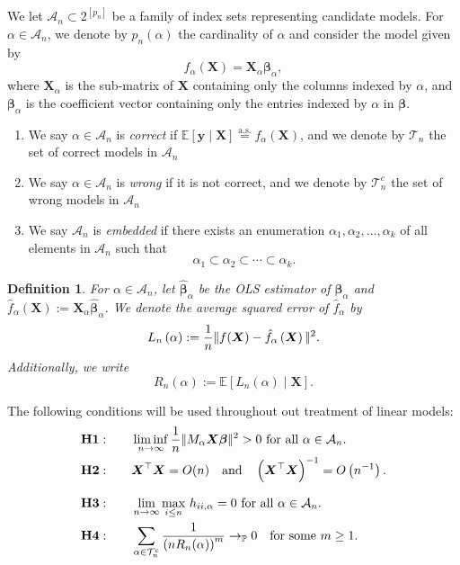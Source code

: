 \documentclass[12pt, letter paper]{article}
\newcommand{\1}{\mathmybb{1}}
\newtheorem{definition}{Definition}[section]
\newcommand{\0}{\emptyset}
\newcommand{\prob}{\mathbb{P}}
\newcommand{\Ep}[1]{\mathbb{E}\left[ #1 \right]}
\newcommand{\paren}[1]{\left(#1 \right)}
\newcommand{\norm}[1]{|\hspace{-1pt}|#1 |\hspace{-1pt}|}
\newcommand{\normsq}[1]{\norm{#1}^{2}}
\newcommand{\Acal}{\mathcal{A}_{n}}
\newcommand{\Tcal}{\mathcal{T}_{n}}
\newcommand{\aseq}{\stackrel{\mathrm{a.s.}}{=}}
\newcommand{\X}{\boldsymbol{X}}
\newcommand{\y}{\boldsymbol{y}}
\newcommand{\bbeta}{\boldsymbol{\beta}}
\newcommand{\bbetahat}{\boldsymbol{\hat{\beta}}}
\newcommand{\Loss}[1]{L_{n}\paren{#1}}
\begin{document}
We let \(\Acal\subset2^{[p_{n}]}\) be a family of index sets representing candidate models. For \(\alpha\in\Acal\), we denote by \(p_{n}(\alpha)\) the cardinality of \(\alpha\) and consider the model given by
\[f_{\alpha}(\X) = \X_{\alpha}\bbeta_{\alpha},\]
where \(\X_{\alpha}\) is the sub-matrix of \(\X\) containing only the columns indexed by \(\alpha\), and \(\bbeta_{\alpha}\) is the coefficient vector containing only the entries indexed by \(\alpha\) in \(\bbeta\).
\begin{enumerate}
    \item We say \(\alpha\in\Acal\) is \emph{correct} if \(\Ep{\y\mid\X}\aseq f_{\alpha}(\X)\), and we denote by \(\Tcal\) the set of correct models in \(\Acal\)
    \item We say \(\alpha\in\Acal\) is \emph{wrong} if it is not correct, and we denote by \(\Tcal^{c}\) the set of wrong models in \(\Acal\)
    \item We say \(\Acal\) is \emph{embedded} if there exists an enumeration \(\alpha_{1}, \alpha_{2}, \ldots, \alpha_{k}\) of all elements in \(\Acal\) such that \[\alpha_{1}\subset\alpha_{2}\subset\cdots\subset\alpha_{k}.\]
\end{enumerate}

\begin{definition}\label{def:loss}
    For \(\alpha\in\Acal\), let \(\bbetahat_{\alpha}\) be the OLS estimator of \(\bbeta_{\alpha}\) and \(\hat{f}_{\alpha}(\X):=\X_{\alpha}\bbetahat_{\alpha}\). We denote the average squared error of \(\hat{f}_{\alpha}\) by
    \[\Loss{\alpha}:=\frac{1}{n}\normsq{f(\X) - \hat{f}_{\alpha}\paren{\X}}.\]
    Additionally, we write
    \[R_{n}(\alpha):= \Ep{\Loss{\alpha}\mid\X}.\]
\end{definition}

The following conditions will be used throughout out treatment of linear models:
\begin{align*}
    &\mathbf{H1:}\qquad \liminf_{n\to\infty} \frac{1}{n}\normsq{M_{\alpha}\X\bbeta}>0 \text{ for all }\alpha \in\Acal.\\
    &\mathbf{H2:} \qquad \X^{\top}\X = O(n)\quad\text{and}\quad\paren{\X^{\top}\X}^{-1}= O\paren{n^{-1}}.\\[2.5mm]
    &\mathbf{H3:}\qquad \lim_{n\to\infty}\max_{i\leq n}\,h_{ii,\alpha} = 0 \text{ for all }\alpha \in\Acal.\\
    &\mathbf{H4:}\qquad \sum_{\alpha\in\Tcal^{c}}\frac{1}{\paren{nR_{n}(\alpha)}^{m}}\to_{\prob}0\quad\text{for some }m\geq 1.
\end{align*}
\end{document}
